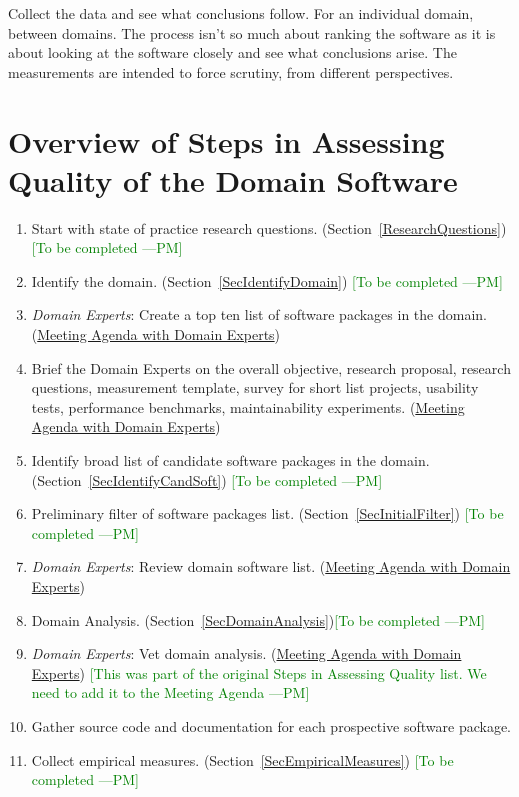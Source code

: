 \documentclass[letterpaper,cleveref]{lipics-v2019}
\newcommand{\authornote}[3]{\textcolor{#1}{[#3 ---#2]}}
\newcommand{\authornote}[3]{}
\newcommand{\pmi}[1]{\authornote{green}{PM}{#1}} %
\theoremstyle{definition}
\begin{document}
Collect the data and see what conclusions follow.  For an individual domain,
between domains.  The process isn't so much about ranking the software as it is
about looking at the software closely and see what conclusions arise.  The
measurements are intended to force scrutiny, from different perspectives.

\section{Overview of Steps in Assessing Quality of the Domain Software}

\begin{enumerate}
\item Start with state of practice research questions. (Section~\ref{ResearchQuestions}) \pmi{To be completed}
\item Identify the domain. (Section~\ref{SecIdentifyDomain}) \pmi{To be completed}
\item \emph{Domain Experts}: Create a top ten list of software packages in the domain. (\href{run:Meeting Agenda with Domain Experts.pdf}{Meeting Agenda with Domain Experts})
\item Brief the Domain Experts on the overall objective, research proposal, research questions, measurement template, survey for short list projects, usability tests, performance benchmarks, maintainability experiments. (\href{run:Meeting Agenda with Domain Experts.pdf}{Meeting Agenda with Domain Experts})
\item Identify broad list of candidate software packages in the domain. (Section~\ref{SecIdentifyCandSoft}) \pmi{To be completed}
\item Preliminary filter of software packages list. (Section~\ref{SecInitialFilter}) \pmi{To be completed}
\item \emph{Domain Experts}: Review domain software list. (\href{run:Meeting Agenda with Domain Experts.pdf}{Meeting Agenda with Domain Experts})
\item Domain Analysis. (Section~\ref{SecDomainAnalysis})\pmi{To be completed}
\item \emph{Domain Experts}: Vet domain analysis. (\href{run:Meeting Agenda with Domain Experts.pdf}{Meeting Agenda with Domain Experts}) \pmi{This was part of the original Steps in Assessing Quality list. We need to add it to the Meeting Agenda}
\item Gather source code and documentation for each prospective software package.
\item Collect empirical measures. (Section~\ref{SecEmpiricalMeasures}) \pmi{To be completed}

\end{enumerate}
\end{document}
